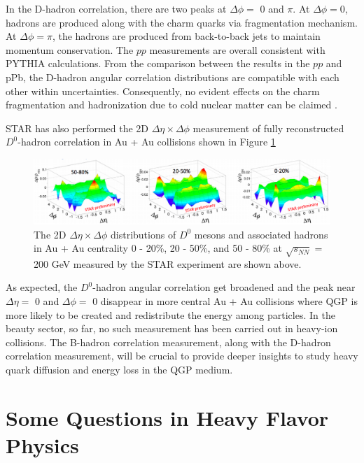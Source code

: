 In the D-hadron correlation, there are two peaks at $\Delta \phi =$ 0 and $\pi$. At $\Delta \phi = $0, hadrons are produced along with the charm quarks via fragmentation mechanism. At $\Delta \phi = \pi$, the hadrons are produced from back-to-back jets to maintain momentum conservation. The $pp$ measurements are overall consistent with PYTHIA calculations. From the comparison between the results in the $pp$ and pPb, the D-hadron angular correlation distributions are compatible with each other within uncertainties. Consequently, no evident effects on the charm fragmentation and hadronization due to cold nuclear matter can be claimed  \cite{DHadronRef}. 

STAR has also performed the 2D $\Delta \eta \times \Delta \phi$ measurement of fully reconstructed $D^0$-hadron correlation in Au + Au collisions \cite{DHadronSTAR} shown in Figure \ref{STARDHadron}

\begin{figure}[hbtp]
\begin{center}
\includegraphics[width=1.05\textwidth]{Figures/Chapter2/STARDHadron.png}
\caption{The 2D $\Delta \eta \times \Delta \phi$ distributions of $D^0$ mesons and associated hadrons in Au + Au centrality 0 - 20\%, 20 - 50\%, and 50 - 80\% at $\sqrt{s_{NN}} = $ 200 GeV measured by the STAR experiment are shown above.}
\label{STARDHadron}
\end{center}
\end{figure} 

As expected, the $D^0$-hadron angular correlation get broadened and the peak near $\Delta \eta = $ 0 and $\Delta \phi = $ 0 disappear in more central Au + Au collisions where QGP is more likely to be created and redistribute the energy among particles. In the beauty sector, so far, no such measurement has been carried out in heavy-ion collisions. The B-hadron correlation measurement, along with the D-hadron correlation measurement, will be crucial to provide deeper insights to study heavy quark diffusion and energy loss in the QGP medium. 

\section{Some Questions in Heavy Flavor Physics}

